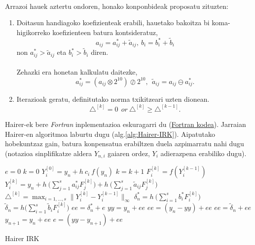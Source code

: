 \paragraph*{}Arrazoi hauek aztertu ondoren, honako konponbideak proposatu zituzten:

\begin{enumerate}
\item Doitasun handiagoko koefizienteak erabili, hauetako bakoitza bi koma-higikorreko koefizienteen batura kontsideratuz,
\begin{equation*}
a_{ij}= a^{\ast}_{ij}+\tilde a_{ij}, \ b_i= b^{\ast}_i+\tilde b_i
\end{equation*} 
non $a^{\ast}_{ij}>\tilde a_{ij}$ eta  $b^{\ast}_i>\tilde b_i$ diren. 


\paragraph*{}Zehazki era honetan kalkulatu daitezke,
\begin{equation*}
a^{\ast}_{ij}=(a_{ij} \otimes 2^{10}) \oslash 2^{10},\ \ \tilde a_{ij}= a_{ij}\ominus a^{\ast}_{ij}.
\end{equation*}


\item Iterazioak geratu, definitutako norma txikitzeari uzten dionean.
\begin{equation*}
\triangle^{[k]} = 0 \ \ or \  \triangle^{[k]} \geqslant \triangle^{[k-1]}.
\end{equation*}
  	 	
\end{enumerate}

Hairer-ek bere \emph{Fortran} inplementazioa eskuragarri du (\href{http://www.unige.ch/~hairer/preprints.html}{Fortran kodea}). Jarraian Hairer-en algoritmoa laburtu dugu (alg.\ref{alg:Hairer-IRK}). Aipatutako hobekuntzaz gain, batura konpensatua erabiltzen duela azpimarratu nahi dugu (notazioa sinplifikatze aldera $Y_{n,i}$ gaiaren ordez, $Y_i$ adierazpena erabiliko dugu).
 

\begin{algorithm}[h!]
 \BlankLine
  $e=0$\;
  {
   \BlankLine
   $k=0$\;
   $Y_{i}^{[0]}=y_n+h \ c_i \ f(y_n) $\; 
   \BlankLine
   {
    \BlankLine 
    $k=k+1$\;
    $F_{i}^{[k]}=f(Y_{i}^{[k-1]}) $\;
    $Y_{i}^{[k]}=y_n+ h \ \big(\sum\limits_{j=1}^{s} a^{\ast}_{ij} F_{j}^{[k]} \big) 
                          + h \ \big(\sum\limits_{j=1}^{s} \tilde a_{ij} F_{j}^{[k]} \big)$\; 
    $\triangle ^{[k]} = \max_{i=1,\dots,s}\|Y_{i}^{[k]}-Y_{i}^{[k-1]}\|_{\infty}$\;
   }
   \BlankLine
    $\delta^{\ast}_{n}=h \ \big(\sum\limits_{i=1}^{s} b^{\ast}_i F_{i}^{[k]} \big)$\;
    $\tilde{\delta}_{n}=h \big(\sum\limits_{i=1}^{s} \tilde b_i F_{i}^{[k]} \big)$\;
    $ee=\delta^{\ast}_{n}+e$\;
    $yy=y_n+ee$\;
    $ee=(y_n-yy)+ee$\;
    \BlankLine
    $ee=\tilde{\delta}_{n}+ee$\;
    $y_{n+1}=y_{n}+ee$\;
    $e=(yy-y_{n+1})+ee$\;            
   \BlankLine
 }
 \caption{Hairer IRK} \label{alg:Hairer-IRK}
\end{algorithm}


